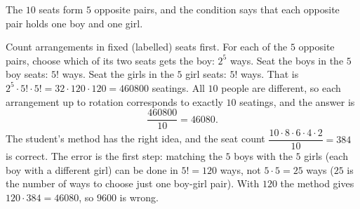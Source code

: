 The $10$ seats form $5$ opposite pairs, and the condition says that each opposite pair holds one boy and one girl.

Count arrangements in fixed (labelled) seats first. For each of the $5$ opposite pairs, choose which of its two seats gets the boy: $2^5$ ways. Seat the boys in the $5$ boy seats: $5!$ ways. Seat the girls in the $5$ girl seats: $5!$ ways. That is $2^5\cdot5!\cdot5!=32\cdot120\cdot120=460800$ seatings. All $10$ people are different, so each arrangement up to rotation corresponds to exactly $10$ seatings, and the answer is
\[
\dfrac{460800}{10}=\boxed{46080}.
\]
The student's method has the right idea, and the seat count $\dfrac{10\cdot8\cdot6\cdot4\cdot2}{10}=384$ is correct. The error is the first step: matching the $5$ boys with the $5$ girls (each boy with a different girl) can be done in $5!=120$ ways, not $5\cdot5=25$ ways ($25$ is the number of ways to choose just one boy-girl pair). With $120$ the method gives $120\cdot384=46080$, so $9600$ is wrong.
